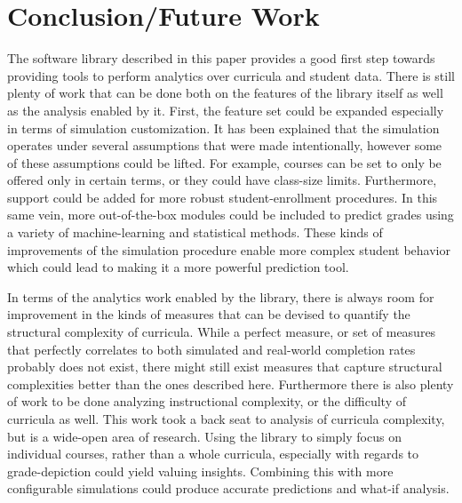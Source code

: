\documentclass[botnum, fleqn]{unmeethesis}
\begin{document}



\chapter{Conclusion/Future Work}
  The software library described in this paper provides a good first step towards providing tools to perform analytics over curricula and student data. There is still plenty of work that can be done both on the features of the library itself as well as the analysis enabled by it. First, the feature set could be expanded especially in terms of simulation customization. It has been explained that the simulation operates under several assumptions that were made intentionally, however some of these assumptions could be lifted. For example, courses can be set to only be offered only in certain terms, or they could have class-size limits. Furthermore, support could be added for more robust student-enrollment procedures. In this same vein, more out-of-the-box modules could be included to predict grades using a variety of machine-learning and statistical methods. These kinds of improvements of the simulation procedure enable more complex student behavior which could lead to making it a more powerful prediction tool.

  In terms of the analytics work enabled by the library, there is always room for improvement in the kinds of measures that can be devised to quantify the structural complexity of curricula. While a perfect measure, or set of measures that perfectly correlates to both simulated and real-world completion rates probably does not exist, there might still exist measures that capture structural complexities better than the ones described here. Furthermore there is also plenty of work to be done analyzing instructional complexity, or the difficulty of curricula as well. This work took a back seat to analysis of curricula complexity, but is a wide-open area of research. Using the library to simply focus on individual courses, rather than a whole curricula, especially with regards to grade-depiction could yield valuing insights. Combining this with more configurable simulations could produce accurate predictions and what-if analysis.
\end{document}
